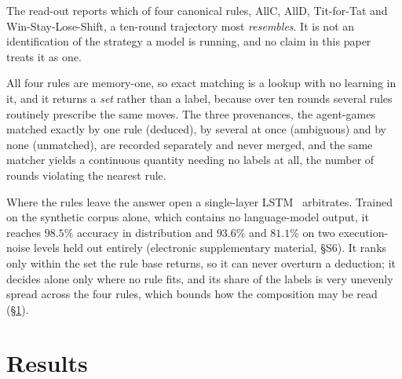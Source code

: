 \documentclass[11pt,a4paper]{article}
\begin{document}
The read-out reports which of four canonical rules, AllC, AllD, Tit-for-Tat and
Win-Stay-Lose-Shift, a ten-round trajectory most \emph{resembles}. It is not an
identification of the strategy a model is running, and no claim in this paper
treats it as one.

All four rules are memory-one, so exact matching is a lookup with no learning in
it, and it returns a \emph{set} rather than a label, because over ten rounds
several rules routinely prescribe the same moves. The three provenances, the
agent-games matched exactly by one rule (deduced), by several at once
(ambiguous) and by none (unmatched), are recorded separately and never merged,
and the same matcher yields a continuous quantity needing no labels at all, the
number of rounds violating the nearest rule.

Where the rules leave the answer open a single-layer
LSTM~\citep{hochreiter1997long} arbitrates. Trained on the synthetic corpus
alone, which contains no language-model output, it reaches $98.5\%$ accuracy in
distribution and $93.6\%$ and $81.1\%$ on two execution-noise levels held out
entirely (electronic supplementary material, \S S6). It ranks only within the
set the rule base returns, so it can never overturn a deduction; it decides
alone only where no rule fits, and its share of the labels is very unevenly
spread across the four rules, which bounds how the composition may be read
(\S\ref{sec:results}).


%
%
%

\section{Results}
\label{sec:results}
\end{document}

